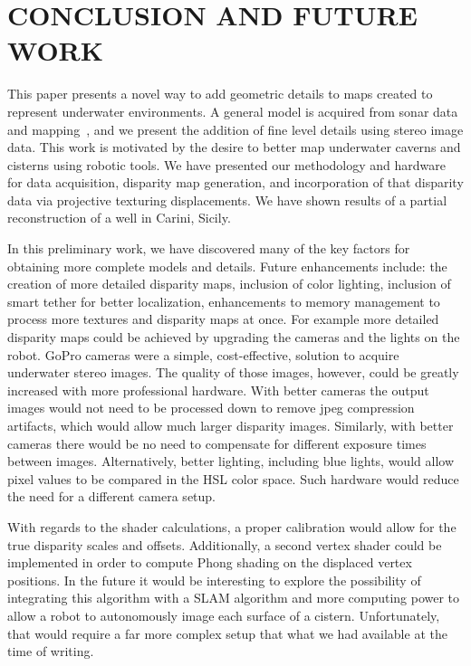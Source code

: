 \documentclass[a4paper,twoside]{article}
\begin{document}

\section{\uppercase{Conclusion and Future Work}}
\label{sec:conclusion}

\noindent 
This paper presents a novel way to add geometric details to maps created to represent underwater environments. A general model is acquired from sonar data and mapping~\cite{ICEX11,McVicker,McVicker2}, and we present the addition of fine level details using stereo image data.  This work is motivated by the desire to better map underwater caverns and cisterns using robotic tools.  We have presented our methodology and hardware for data acquisition, disparity map generation, and incorporation of that disparity data via projective texturing displacements.  We have shown results of a partial reconstruction of a well in Carini, Sicily.

In this preliminary work, we have discovered many of the key factors for obtaining more complete models and details.  Future enhancements include: the creation of more detailed disparity maps, inclusion of color lighting, inclusion of smart tether for better localization, enhancements to memory management to process more textures and disparity maps at once.
For example more detailed disparity maps could be achieved by upgrading the cameras and the lights on the robot.  
GoPro cameras were a simple, cost-effective, solution to acquire underwater stereo images.  
The quality of those images, however, could be greatly increased with more professional hardware.  
With better cameras the output images would not need to be processed down to remove jpeg compression artifacts, which would allow much larger disparity images.  
Similarly, with better cameras there would be no need to compensate for different exposure times between images.
Alternatively, better lighting, including blue lights, would allow pixel values to be compared in the HSL color space.  
Such hardware would reduce the need for a different camera setup.

With regards to the shader calculations, a proper calibration would allow for the true disparity scales and offsets. 
Additionally, a second vertex shader could be implemented in order to compute Phong shading on the displaced vertex positions.
In the future it would be interesting to explore the possibility of integrating this algorithm with a SLAM algorithm and more computing power to allow a robot to autonomously image each surface of a cistern. 
Unfortunately, that would require a far more complex setup that what we had available at the time of writing.
\end{document}
